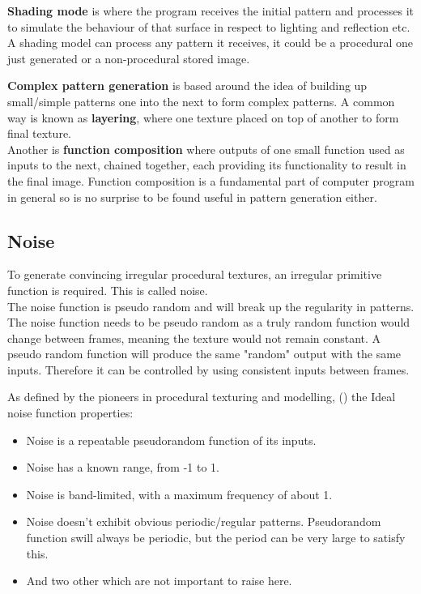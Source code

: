 \documentclass{report}
\begin{document}
\textbf{Shading mode} is where the program receives the initial pattern and processes it to simulate the behaviour of that surface in respect to lighting and reflection etc. A shading model can process any pattern it receives, it could be a procedural one just generated or a non-procedural stored image.

\textbf{Complex pattern generation} is based around the idea of building up small/simple patterns one into the next to form complex patterns. A common way is known as \textbf{layering}, where one texture placed on top of another to form final texture.\\
Another is \textbf{function composition} where outputs of one small function used as inputs to the next, chained together, each providing its functionality to result in the final image. Function composition is a fundamental part of computer program in general so is no surprise to be found useful in pattern generation either.

\citep{ebert2003texturing}

\subsection{Noise}

To generate convincing irregular procedural textures, an irregular primitive function is required. This is called noise.\\
The noise function is pseudo random and will break up the regularity in patterns.\\
The noise function needs to be pseudo random as a truly random function would change between frames, meaning the texture would not remain constant. A
pseudo random function will produce the same "random" output with the same inputs. Therefore it can be controlled by using consistent inputs between frames.

As defined by the pioneers in procedural texturing and modelling, (\citep{ebert2003texturing}) the Ideal noise function properties:
\begin{itemize}
	\item Noise is a repeatable pseudorandom function of its inputs.
	\item Noise has a known range, from -1 to 1.
	\item Noise is band-limited, with a maximum frequency of about 1.
	\item Noise doesn't exhibit obvious periodic/regular patterns. Pseudorandom function swill always be periodic, but the period can be very large to satisfy this.
	\item And two other which are not important to raise here.
\end{itemize}
\end{document}
